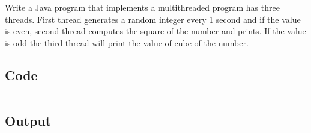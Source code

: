 \documentclass[../main.tex]{subfiles}
\begin{document}
Write a Java program that implements a multithreaded program has three
threads. First thread generates a random integer every 1 second and if the
value is even, second thread computes the square of the number and prints. If
the value is odd the third thread will print the value of cube of the number.


\subsection{Code}
\inputminted[frame=lines, breaklines, breakanywhere, numberblanklines=false]{java}{./programs/prog9/Multithread.java}

\subsection{Output}
\end{document}
